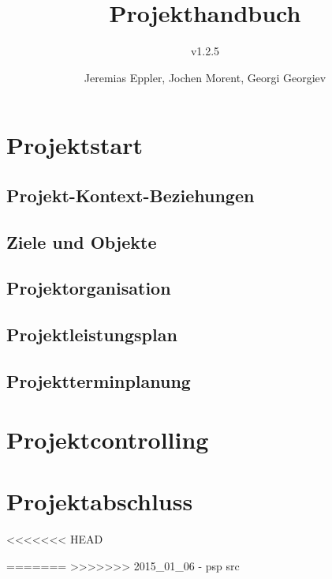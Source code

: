\documentclass[10pt,a4paper]{scrreprt}
\title{Projekthandbuch}
\subtitle{v1.2.5}
\author{Jeremias Eppler, Jochen Morent, Georgi Georgiev}
\begin{document}
\maketitle
\tableofcontents
\newpage
\chapter{Projektstart}
	\section{Projekt-Kontext-Beziehungen}
		
		\newpage
		
		\newpage
		
	\clearpage
	\section{Ziele und Objekte}
		
	\clearpage
	\section{Projektorganisation}
		
	\clearpage
	\section{Projektleistungsplan}
		
		\newpage
		
	\clearpage
	\section{Projektterminplanung}
		
		\newpage
		
		\newpage
		

\newpage
\chapter{Projektcontrolling}
	
	\clearpage
	

\newpage
\chapter{Projektabschluss}
<<<<<<< HEAD
	
=======
>>>>>>> 2015_01_06 - psp src
\end{document}

